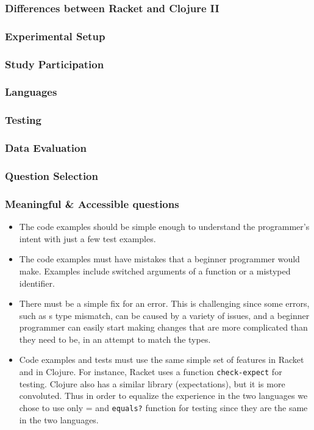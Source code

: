 \documentclass{beamer}
\begin{document}
\begin{frame}
\frametitle{Differences between Racket and Clojure II}
\end{frame}

\begin{frame}
\frametitle{Experimental Setup}
\end{frame}

\begin{frame}
\frametitle{Study Participation}
\end{frame}

\begin{frame}
\frametitle{Languages}
\end{frame}

\begin{frame}
\frametitle{Testing}
\end{frame}

\begin{frame}
\frametitle{Data Evaluation}
\end{frame}

\begin{frame}
\frametitle{Question Selection}
\end{frame}

\begin{frame}
	\frametitle{Meaningful \& Accessible questions}
	\begin{itemize}
		\item The code examples should be simple enough to understand the programmer's intent with just a few test examples. 
		\item The code examples must have mistakes that a beginner programmer would make. Examples include switched arguments of a function or a mistyped identifier. 
		\item There must be a simple fix for an error. This is challenging since some errors, such as s type mismatch, can be caused by a variety of issues, and a beginner
	programmer can easily start making changes that are more complicated than they need to be, in an attempt to match the types. 
		\item Code examples and tests must use the same simple set of features in Racket and in Clojure. For instance, Racket uses a function \texttt{check-expect} for testing. Clojure also has a similar library (expectations), but it is more convoluted. Thus in order to equalize the experience in the two languages we chose to use only = and \texttt{equals?} function for testing since they are the same in the two languages. 
	\end{itemize}
\end{frame}
\end{document}
